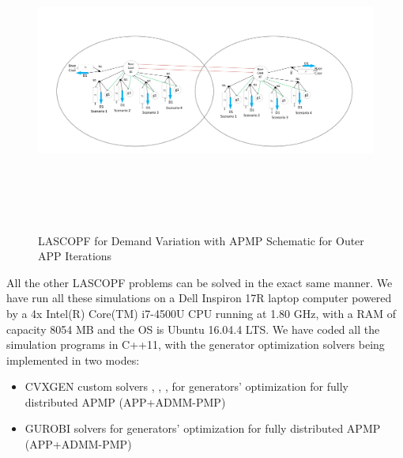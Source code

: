 \documentclass[preprint,12pt,3p]{elsarticle}
\begin{document}
\begin{figure}
\begin{center}
\vspace*{-2cm}
\includegraphics[height=10cm,width=17cm]{LASCOPF_Prox_Fig.pdf}
\caption{LASCOPF for Demand Variation with APMP Schematic for Outer APP Iterations}
\label{LASCOPFDV_APMP}
\end{center}
\end{figure}
All the other LASCOPF problems can be solved in the exact same manner. We have run all these simulations on a Dell Inspiron 17R laptop computer powered by a 4x Intel(R) Core(TM) i7-4500U CPU running at 1.80 GHz, with a RAM of capacity 8054 MB and the OS is Ubuntu 16.04.4 LTS. We have coded all the simulation programs in C++11, with the generator optimization solvers being implemented in two modes: 
\begin{itemize}
    \item CVXGEN custom solvers \cite{cvxgen01}, \cite{cvxgen02}, \cite{cvxgen03}, \cite{cvxgen04} for generators' optimization for fully distributed APMP (APP+ADMM-PMP)
    \item GUROBI solvers for generators' optimization for fully distributed APMP (APP+ADMM-PMP)
\end{itemize} 
\end{document}
